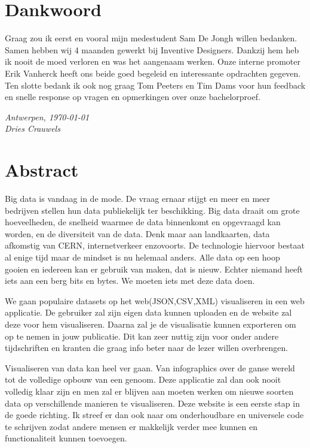 
\frontmatter
\thispagestyle{empty}   


\chapter{Dankwoord}
\vspace{0.35in}

Graag zou ik eerst en vooral mijn medestudent Sam De Jongh willen bedanken. Samen hebben wij 4 maanden gewerkt bij Inventive Designers. Dankzij hem heb ik nooit de moed verloren en was het aangenaam werken. Onze interne promoter Erik Vanherck heeft ons beide goed begeleid en interessante opdrachten gegeven. Ten slotte bedank ik ook nog graag Tom Peeters en Tim Dams voor hun feedback en snelle response op vragen en opmerkingen over onze bachelorproef.


\begin{flushright}{\emph{Antwerpen, \today \\
Dries Crauwels}}
\end{flushright}


\chapter{Abstract}
Big data is vandaag in de mode. De vraag ernaar stijgt en meer en meer bedrijven stellen hun data publiekelijk ter beschikking. Big data draait om grote hoeveelheden, de snelheid waarmee de data binnenkomt en opgevraagd kan worden, en de diversiteit van de data. Denk maar aan landkaarten, data afkomstig van CERN, internetverkeer enzovoorts. De technologie hiervoor bestaat al enige tijd maar de mindset is nu helemaal anders. Alle data op een hoop gooien en iedereen kan er gebruik van maken, dat is nieuw. Echter niemand heeft iets aan een berg bits en bytes. We moeten iets met deze data doen.

We gaan populaire datasets op het web(JSON,CSV,XML) visualiseren in een web applicatie. De gebruiker zal zijn eigen data kunnen uploaden en de website zal deze voor hem visualiseren. Daarna zal je de visualisatie kunnen exporteren om op te nemen in jouw publicatie. Dit kan zeer nuttig zijn voor onder andere tijdschriften en kranten die graag info beter naar de lezer willen overbrengen. 

Visualiseren van data kan heel ver gaan. Van infographics over de ganse wereld tot de volledige opbouw van een genoom. Deze applicatie zal dan ook nooit volledig klaar zijn en men zal er blijven aan moeten werken om nieuwe soorten data op verschillende manieren te visualiseren. Deze website is een eerste stap in de goede richting. Ik streef er dan ook naar om onderhoudbare en universele code te schrijven zodat andere mensen er makkelijk verder mee kunnen en functionaliteit kunnen toevoegen.

